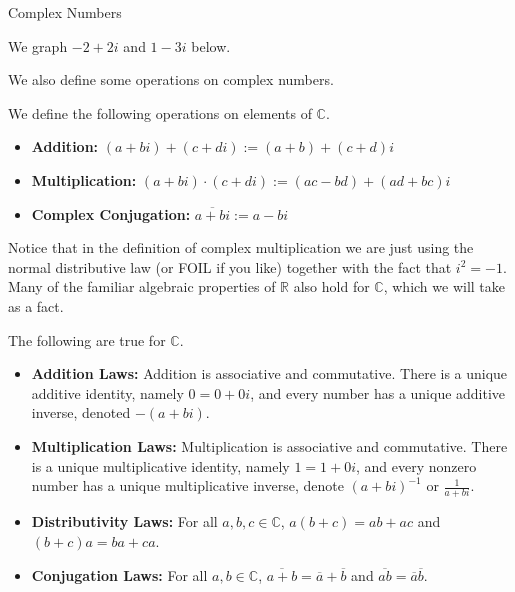 \begin{section}{Complex Numbers}
\begin{example}
We graph $-2 + 2i$ and  $1 - 3i$ below.
\begin{center}
\end{center}
\end{example}

We also define some operations on complex numbers.

\begin{definition}
We define the following operations on elements of $\mathbb{C}$. 
\begin{itemize}
\item \textbf{Addition:} $(a+bi) + (c+di) := (a+b) + (c+d)i$
\item \textbf{Multiplication:} $(a+bi) \cdot (c+di) := (ac-bd) + (ad+bc)i$
\item \textbf{Complex Conjugation:} $\overline{a+bi} := a-bi$
\end{itemize}
\end{definition}

Notice that in the definition of complex multiplication we are just using the normal distributive law (or FOIL if you like) together with the fact that $i^2 = -1$. Many of the familiar algebraic properties of $\mathbb{R}$ also hold for $\mathbb{C}$, which we will take as a fact.

\begin{fact}\label{fact.ComplexLaws} The following are true for $\mathbb{C}$.
\begin{itemize}
\item \textbf{Addition Laws:} Addition is associative and commutative. There is a unique additive identity, namely $0 = 0 + 0i$, and every number has a unique additive inverse, denoted $-(a+bi)$.
\item \textbf{Multiplication Laws:} Multiplication is associative and commutative. There is a unique multiplicative identity, namely $1 = 1 + 0i$, and every nonzero number has a unique multiplicative inverse, denote $(a+bi)^{-1}$ or $\frac{1}{a+bi}$.
\item \textbf{Distributivity Laws:} For all $a,b,c \in \mathbb{C}$, $a(b+c) = ab+ac$ and $(b+c)a = ba+ca$.
\item \textbf{Conjugation Laws:} For all $a,b \in \mathbb{C}$, $\overline{a+b} = \overline{a} + \overline{b}$ and $\overline{ab} = \overline{a}\overline{b}$.
\end{itemize}
\end{fact}


\end{section}
